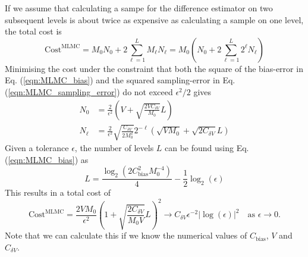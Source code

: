 \documentclass[11pt]{article}
\begin{document}
If we assume that calculating a sampe for the difference estimator on two subsequent levels is about twice as expensive as calculating a sample on one level, the total cost is
\begin{equation}
  \text{Cost}^{\text{MLMC}} = M_0N_0 + 2\sum_{\ell=1}^{L} M_\ell N_\ell =
  M_0 \left(N_0 + 2\sum_{\ell=1}^{L} 2^\ell N_\ell\right)
\end{equation}
Minimising the cost under the constraint that both the square of the bias-error in Eq. (\ref{eqn:MLMC_bias}) and the squared sampling-error in Eq. (\ref{eqn:MLMC_sampling_error}) do not exceed $\epsilon^2/2$ gives
\begin{equation}
  \begin{aligned}
    N_0 &= \frac{2}{\epsilon^2}\left(V+\sqrt{\frac{2VC_{\delta V}}{M_0}}L\right)\\
    N_{\ell} &= \frac{2}{\epsilon^2}\sqrt{\frac{C_{\delta V}}{2M_0^2}} 2^{-\ell}\left(\sqrt{VM_0}+\sqrt{2C_{\delta V}}L\right)
  \end{aligned}
\end{equation}
Given a tolerance $\epsilon$, the number of levels $L$ can be found using Eq. (\ref{eqn:MLMC_bias}) as
\begin{equation}
  L = \frac{ \log_2\left(2C_{\text{bias}}^2M_0^{-4}\right)}{4}-\frac{1}{2}\log_2(\epsilon)
\end{equation}
This results in a total cost of
\begin{equation}
  \text{Cost}^{\text{MLMC}} = \frac{2VM_0}{\epsilon^2}\left(1+\sqrt{\frac{2C_{\delta V}}{M_0 V}}L\right)^2 \rightarrow C_{\delta V}\epsilon^{-2}|\log(\epsilon)|^2\quad\text{as $\epsilon\rightarrow 0$}.
\end{equation}
Note that we can calculate this if we know the numerical values of $C_{\text{bias}}$, $V$ and $C_{\delta V}$.
\end{document}
